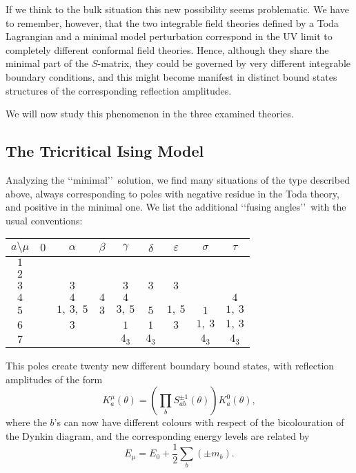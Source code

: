 \documentclass[a4paper,12pt]{report}
\begin{document}
If we think to the bulk situation this new possibility seems problematic. We have to remember, however, that the
two integrable field theories defined by a Toda Lagrangian and a minimal model perturbation correspond in the UV
limit to completely different conformal field theories. Hence, although they share the minimal part of the
$S$-matrix, they could be governed by very different integrable boundary conditions, and this might become
manifest in distinct bound states structures of the corresponding reflection amplitudes.

We will now study this phenomenon in the three examined theories.



\subsection{The Tricritical Ising Model}

Analyzing the \lq\lq minimal\rq\rq \, solution, we find many situations of the type described above, always
corresponding to poles with negative residue in the Toda theory, and positive in the minimal one. We list the
additional \lq\lq fusing angles\rq\rq \, with the usual conventions:

\begin{center}
\begin{tabular}{|c|c|c|c|c|c|c|c|c|}\hline
 $ a\setminus\mu$  &  $ 0$  &  $ \alpha$ &  $ \beta$ &  $ \gamma$& $\delta$ & $\varepsilon$ & $\sigma$ & $\tau$\\ \hline
  $1$ &   &   &   &   &  &  &  & \\ \hline
  $2$ &   &   &   &   &  &  &  & \\ \hline
  $3$ &   & $3$ &  & $3$ & $3$ & $3$ &  & \\ \hline
  $4$ &   &  $4$ & $4$  & $4$  &  &  &  & $4$ \\ \hline
  $5$ &   &  $1,\:3,\:5$  & $3$ & $3,\:5$ & $5$ & $1,\:5$ & $1$ & $1,\:3$ \\ \hline
  $6$ &   & $3$ &  & $1$ & $1$ & $3$ & $1,\:3$ & $1,\:3$\\ \hline
  $7$ &   &  &  & $4_{3}$ & $4_{3}$ &  & $4_{3}$ & $4_{3}$\\ \hline

  \end{tabular}
\end{center}

\vspace{0.5cm}

This poles create twenty new different boundary bound states, with reflection amplitudes of the form
\begin{equation}\label{noncolour}
K_{a}^{\mu}\left(\theta\right)=\left(\prod_{b}S_{ab}^{\pm
1}\left(\theta\right)\right)K_{a}^{0}\left(\theta\right),
\end{equation}
where the $b$'s can now have different colours with respect of the bicolouration of the Dynkin diagram, and the
corresponding energy levels are related by
\begin{equation}\label{level}
E_{\mu}=E_{0}+\frac{1}{2}\sum_{b}\left(\pm m_{b}\right).
\end{equation}
\end{document}
